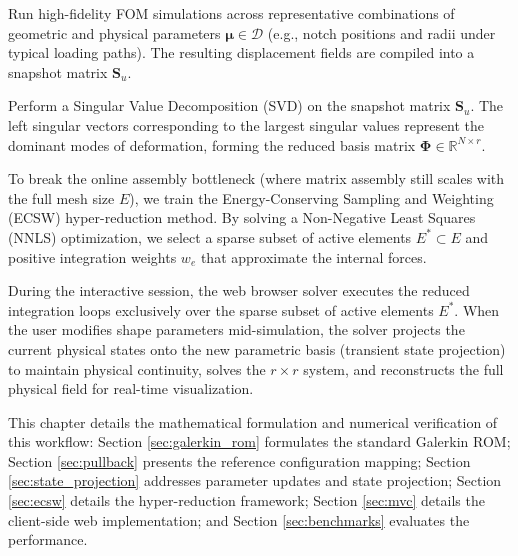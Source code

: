 \begin{tcolorbox}[colback=blue!5!white,colframe=blue!65!black,title={\textbf{Step 2: Offline Snapshot Collection (Data Generation)}}, fonttitle=\bfseries]
Run high-fidelity FOM simulations across representative combinations of geometric and physical parameters $\boldsymbol{\mu} \in \mathcal{D}$ (e.g., notch positions and radii under typical loading paths). The resulting displacement fields are compiled into a snapshot matrix $\mathbf{S}_u$.
\end{tcolorbox}

\begin{tcolorbox}[colback=blue!5!white,colframe=blue!65!black,title={\textbf{Step 3: Proper Orthogonal Decomposition (Basis Construction)}}, fonttitle=\bfseries]
Perform a Singular Value Decomposition (SVD) on the snapshot matrix $\mathbf{S}_u$. The left singular vectors corresponding to the largest singular values represent the dominant modes of deformation, forming the reduced basis matrix $\boldsymbol{\Phi} \in \mathbb{R}^{N \times r}$.
\end{tcolorbox}

\begin{tcolorbox}[colback=blue!5!white,colframe=blue!65!black,title={\textbf{Step 4: Hyper-Reduction Training (ECSW NNLS Optimization)}}, fonttitle=\bfseries]
To break the online assembly bottleneck (where matrix assembly still scales with the full mesh size $E$), we train the Energy-Conserving Sampling and Weighting (ECSW) hyper-reduction method. By solving a Non-Negative Least Squares (NNLS) optimization, we select a sparse subset of active elements $E^* \subset E$ and positive integration weights $w_e$ that approximate the internal forces.
\end{tcolorbox}

\begin{tcolorbox}[colback=blue!5!white,colframe=blue!65!black,title={\textbf{Step 5: Online Real-Time Simulation and State Projection}}, fonttitle=\bfseries]
During the interactive session, the web browser solver executes the reduced integration loops exclusively over the sparse subset of active elements $E^*$. When the user modifies shape parameters mid-simulation, the solver projects the current physical states onto the new parametric basis (transient state projection) to maintain physical continuity, solves the $r \times r$ system, and reconstructs the full physical field for real-time visualization.
\end{tcolorbox}


This chapter details the mathematical formulation and numerical verification of this workflow: Section \ref{sec:galerkin_rom} formulates the standard Galerkin ROM; Section \ref{sec:pullback} presents the reference configuration mapping; Section \ref{sec:state_projection} addresses parameter updates and state projection; Section \ref{sec:ecsw} details the hyper-reduction framework; Section \ref{sec:mvc} details the client-side web implementation; and Section \ref{sec:benchmarks} evaluates the performance.



